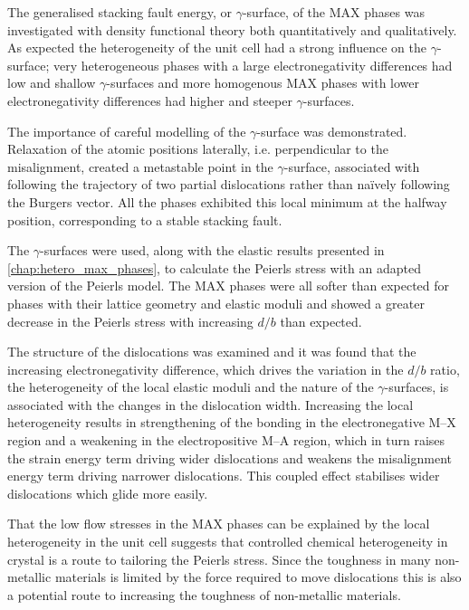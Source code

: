 The generalised stacking fault energy, or $\gamma$-surface, of the MAX phases was investigated with density functional theory both quantitatively and qualitatively. As expected the heterogeneity of the unit cell had a strong influence on the $\gamma$-surface; very heterogeneous phases with a large electronegativity differences had low and shallow $\gamma$-surfaces and more homogenous MAX phases with lower electronegativity differences had higher and steeper $\gamma$-surfaces.

The importance of careful modelling of the $\gamma$-surface was demonstrated. Relaxation of the atomic positions laterally, i.e. perpendicular to the misalignment, created a metastable point in the $\gamma$-surface, associated with following the trajectory of two partial dislocations rather than na\"{i}vely following the Burgers vector. All the phases exhibited this local minimum at the halfway position, corresponding to a stable stacking fault.

The $\gamma$-surfaces were used, along with the elastic results presented in \autoref{chap:hetero_max_phases}, to calculate the Peierls stress with an adapted version of the Peierls model. The MAX phases were all softer than expected for phases with their lattice geometry and elastic moduli and showed a greater decrease in the Peierls stress with increasing $d/b$ than expected.

The structure of the dislocations was examined and it was found that the increasing electronegativity difference, which drives the variation in the $d/b$ ratio, the heterogeneity of the local elastic moduli and the nature of the $\gamma$-surfaces, is associated with the changes in the dislocation width. Increasing the local heterogeneity results in strengthening of the bonding in the electronegative M--X region and a weakening in the electropositive M--A region, which in turn raises the strain energy term driving wider dislocations and weakens the misalignment energy term driving narrower dislocations. This coupled effect stabilises wider dislocations which glide more easily.


That the low flow stresses in the MAX phases can be explained by the local heterogeneity in the unit cell suggests that controlled chemical heterogeneity in crystal is a route to tailoring the Peierls stress. Since the toughness in many non-metallic materials is limited by the force required to move dislocations this is also a potential route to increasing the toughness of non-metallic materials.






























